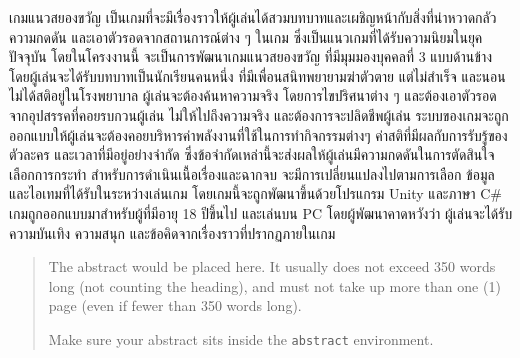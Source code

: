 \maketitle
\makesignature

\ifproject
    \begin{abstractTH}

        เกมแนวสยองขวัญ เป็นเกมที่จะมีเรื่องราวให้ผู้เล่นได้สวมบทบาทและเผชิญหน้ากับสิ่งที่น่าหวาดกลัว ความกดดัน และเอาตัวรอดจากสถานการณ์ต่าง ๆ ในเกม 
        ซึ่งเป็นแนวเกมที่ได้รับความนิยมในยุคปัจจุบัน โดยในโครงงานนี้ จะเป็นการพัฒนาเกมแนวสยองขวัญ ที่มีมุมมองบุคคลที่ 3 แบบด้านข้าง โดยผู้เล่นจะได้รับบทบาทเป็นนักเรียนคนหนึ่ง 
        ที่มีเพื่อนสนิทพยายามฆ่าตัวตาย แต่ไม่สำเร็จ และนอนไม่ได้สติอยู่ในโรงพยาบาล ผู้เล่นจะต้องค้นหาความจริง โดยการไขปริศนาต่าง ๆ และต้องเอาตัวรอดจากอุปสรรคที่คอยรบกวนผู้เล่น 
        ไม่ให้ไปถึงความจริง และต้องการจะปลิดชีพผู้เล่น ระบบของเกมจะถูกออกแบบให้ผู้เล่นจะต้องคอยบริหารค่าพลังงานที่ใช้ในการทำกิจกรรมต่างๆ ค่าสติที่มีผลกับการรับรู้ของตัวละคร 
        และเวลาที่มีอยู่อย่างจำกัด ซึ่งข้อจำกัดเหล่านี้จะส่งผลให้ผู้เล่นมีความกดดันในการตัดสินใจเลือกการกระทำ สำหรับการดำเนินเนื้อเรื่องและฉากจบ จะมีการเปลี่ยนแปลงไปตามการเลือก ข้อมูล 
        และไอเทมที่ได้รับในระหว่างเล่นเกม โดยเกมนี้จะถูกพัฒนาขึ้นด้วยโปรแกรม Unity และภาษา C$\#$ เกมถูกออกแบบมาสำหรับผู้ที่มีอายุ 18 ปีขึ้นไป และเล่นบน PC โดยผู้พัฒนาคาดหวังว่า 
        ผู้เล่นจะได้รับความบันเทิง ความสนุก และข้อคิดจากเรื่องราวที่ปรากฏภายในเกม
    \end{abstractTH}

    \begin{abstract}
        The abstract would be placed here. It usually does not exceed 350 words
        long (not counting the heading), and must not take up more than one (1) page
        (even if fewer than 350 words long).

        Make sure your abstract sits inside the \texttt{abstract} environment.
    \end{abstract}

